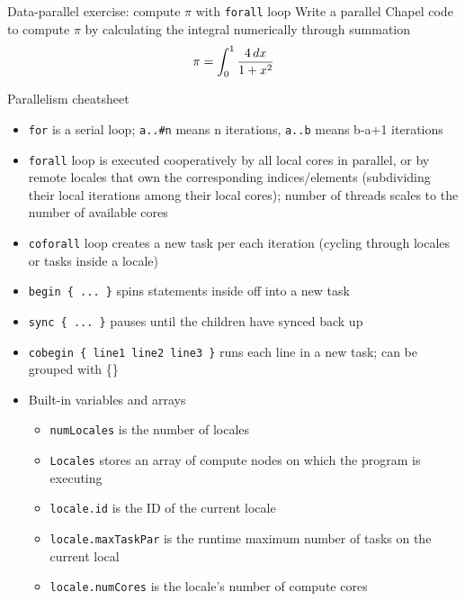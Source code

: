 \documentclass[10pt,xcolor=pdftex,dvipsnames,table]{beamer}
\newcommand{\tc}{\textcolor}
\begin{document}
\begin{frame}{Data-parallel exercise: compute $\pi$ with \texttt{forall} loop}
  Write a parallel Chapel code to compute $\pi$ by calculating the integral numerically through summation
  {\Large
    \[
    \pi=\int_0^1{4\,dx\over 1+x^2}
    \]}
\end{frame}

\begin{frame}{Parallelism cheatsheet}
  {\let\normalsize\footnotesize \normalsize
    \begin{itemize}\setlength{\itemsep}{0.3mm}
    \item \tc{Mahogany}{\texttt{for}} is a serial loop; \quad\tc{Mahogany}{\texttt{a..\#n}} means n
      iterations, \quad\tc{Mahogany}{\texttt{a..b}} means b-a+1 iterations
    \item \tc{Mahogany}{\texttt{forall}} loop is executed cooperatively by all local cores in parallel,
      or by remote locales that own the corresponding indices/elements (subdividing their local
      iterations among their local cores); number of threads scales to the number of available cores
    \item \tc{Mahogany}{\texttt{coforall}} loop creates a new task per each iteration (cycling through
      locales or tasks inside a locale)
    \item \tc{Mahogany}{\texttt{begin \{ ... \}}} spins statements inside off into a new task
    \item \tc{Mahogany}{\texttt{sync \{ ... \}}} pauses until the children have synced back up
    \item \tc{Mahogany}{\texttt{cobegin \{ line1 line2 line3 \}}} runs each line in a new task; can be
      grouped with \{\}
    \item Built-in variables and arrays
      {\let\small\scriptsize
        \begin{itemize}\setlength{\itemsep}{0.1mm}
        \item \tc{Mahogany}{\texttt{numLocales}} is the number of locales
        \item \tc{Mahogany}{\texttt{Locales}} stores an array of compute nodes on which the program is
          executing
        \item \tc{Mahogany}{\texttt{locale.id}} is the ID of the current locale
        \item \tc{Mahogany}{\texttt{locale.maxTaskPar}} is the runtime maximum number of tasks on the
          current local
        \item \tc{Mahogany}{\texttt{locale.numCores}} is the locale's number of compute cores

\end{itemize}}
\end{itemize}}
\end{frame}
\end{document}
